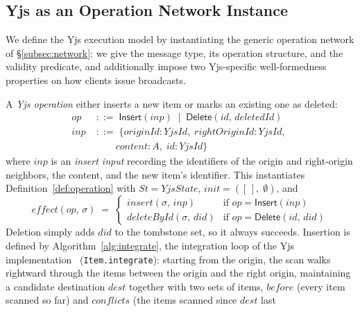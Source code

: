 \documentclass[sigplan,screen]{acmart}
\newcommand{\leanref}[1]{\texttt{#1}}
\newcommand{\bnfdef}{\;::=\;}
\newcommand{\bnfmid}{\;\mid\;}
\newcommand{\effect}{\mathit{effect}}
\begin{document}
\subsection{Yjs as an Operation Network Instance}
\label{subsec:yjs-network}

We define the Yjs execution model by instantiating the generic operation
network of \S\ref{subsec:network}: we give the message type, its
operation structure, and the validity predicate, and additionally impose
two Yjs-specific well-formedness properties on how clients issue
broadcasts.

\begin{definition}[Yjs operation (\leanref{YjsOperation})]\label{def:yjs-operation}
A \emph{Yjs operation} either inserts a new item or marks an existing one as
deleted:
\begin{align*}
  \mathit{op} &\bnfdef \mathsf{Insert}(\mathit{inp})
                \bnfmid \mathsf{Delete}(\mathit{id},\, \mathit{deletedId}) \\
  \mathit{inp} &\bnfdef \{
    \mathit{originId} : \mathit{YjsId},\;
    \mathit{rightOriginId} : \mathit{YjsId},\; \\
  &\qquad\; \mathit{content} : A,\;
    \mathit{id} : \mathit{YjsId} \}
\end{align*}
where $\mathit{inp}$ is an \emph{insert input} recording the identifiers of
the origin and right-origin neighbors, the content, and the new item's
identifier.  This instantiates Definition~\ref{def:operation} with
$\mathit{St} = \mathit{YjsState}$,
$\mathit{init} = ([\,],\; \emptyset)$, and
\[
  \effect(\mathit{op},\, \sigma) \;=\;
  \begin{cases}
    \mathit{insert}(\sigma,\, \mathit{inp})
      & \text{if } \mathit{op} = \mathsf{Insert}(\mathit{inp}) \\
    \mathit{deleteById}(\sigma,\, \mathit{did})
      & \text{if } \mathit{op} = \mathsf{Delete}(\mathit{id},\, \mathit{did})
  \end{cases}
\]
Deletion simply adds $\mathit{did}$ to the tombstone set, so it always
succeeds.  Insertion is defined by Algorithm~\ref{alg:integrate}, the
integration loop of the Yjs implementation~\cite{Yjs2023}
(\texttt{Item.integrate}): starting from the origin, the scan walks
rightward through the items between the origin and the right origin,
maintaining a candidate destination $\mathit{dest}$ together with two
sets of items, $\mathit{before}$ (every item scanned so far) and
$\mathit{conflicts}$ (the items scanned since $\mathit{dest}$ last

\end{definition}
\end{document}
